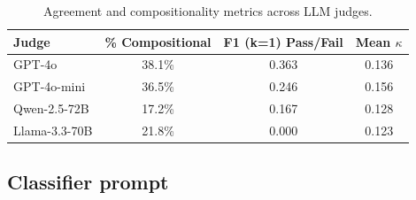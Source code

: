 \documentclass[11pt]{article}
\begin{document}
   \begin{table}[t]
  \centering
  \caption{Agreement and compositionality metrics across LLM judges.}
  \label{tab:judge_comparison}
  \begin{tabular}{lccc}
  \hline
  \textbf{Judge} & \textbf{\% Compositional} & \textbf{F1 (k=1) Pass/Fail} & \textbf{Mean $\kappa$} \\
  \hline
  GPT-4o          & 38.1\% & 0.363 & 0.136 \\
  GPT-4o-mini     & 36.5\% & 0.246 & 0.156 \\
  Qwen-2.5-72B    & 17.2\% & 0.167 & 0.128 \\
  Llama-3.3-70B   & 21.8\% & 0.000 & 0.123 \\
  \hline
  \end{tabular}
  \end{table}
  \subsection{Classifier prompt}
\end{document}
